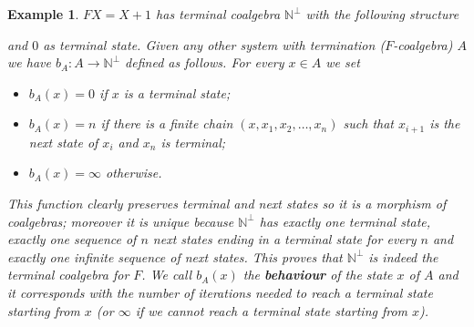 \documentclass[letterpaper, 11pt, oneside]{memoir}
\theoremstyle{myteo}
\newtheorem{example}[theorem]{Example}
\numberwithin{equation}{section}
\begin{document}
\begin{example}
  \label{ex:terminalcoalgebra1}
  \(FX = X + 1\) has terminal coalgebra \(\mathbb{N}^\bot\) with the following structure
  \begin{center}
  \end{center}
  and \(0\) as terminal state.
  Given any other system with termination (\(F\)-coalgebra) \(A\) we have \(b_A : A \to \mathbb{N}^\bot\) defined as follows.
  For every \(x \in A\) we set
  \begin{itemize}
  \item[1.] \(b_A(x) = 0\) if \(x\) is a terminal state;
  \item[2.] \(b_A(x) = n\) if there is a finite chain \((x, x_1, x_2, \ldots, x_n)\) such that \(x_{i+1}\) is the next state of \(x_i\) and \(x_n\) is terminal;
  \item[3.] \(b_A(x) = \infty\) otherwise.
  \end{itemize}
  This function clearly preserves terminal and next states so it is a morphism of coalgebras; moreover it is unique because \(\mathbb{N}^\bot\) has exactly one terminal state, exactly one sequence of \(n\) next states ending in a terminal state for every \(n\) and exactly one infinite sequence of next states.
  This proves that \(\mathbb{N}^\bot\) is indeed the terminal coalgebra for \(F\).
  We call \(b_A(x)\) the \textbf{behaviour} of the state \(x\) of \(A\) and it corresponds with the number of iterations needed to reach a terminal state starting from \(x\) (or \(\infty\) if we cannot reach a terminal state starting from \(x\)).
\end{example}
\end{document}
